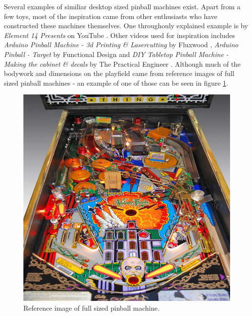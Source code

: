 Several examples of similiar desktop sized pinball machines exist. Apart from a few toys, most of the inspiration came from other enthusiasts who have constructed these machines themselves.
One throughouly explained example is by \textit{Element 14 Presents} on YouTube \cite{presents_2017}. Other videos used for inspiration includes \textit{Arduino Pinball Machine - 3d Printing \& Lasercutting} by Fluxwood \cite{fluxwood_2018}, \textit{Arduino Pinball - Target} by Functional Design\cite{functionaldesign_2017} and \textit{DIY Tabletop Pinball Machine - Making the cabinet \& decals} by The Practical Engineer \cite{engineer_2018}.
Although much of the bodywork and dimensions on the playfield came from reference images of full sized pinball machines - an example of one of those can be seen in figure \ref{fig:playfield_example}.

\begin{figure}
	\centering
	\includegraphics[scale=0.3]{img/example_playfield}
	\caption{Reference image of full sized pinball machine\cite{reference_picture}.}
	\label{fig:playfield_example}
\end{figure}